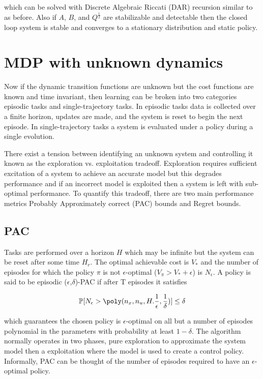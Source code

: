 \documentclass{article}[12pt]
\begin{document}
which can be solved with Discrete Algebraic Riccati (DAR) recursion similar to as before. Also if $A$, $B$, and $Q^{\frac{1}{2}}$ are stabilizable and detectable then the closed loop system is stable and converges to a stationary distribution and static policy.

\section{MDP with unknown dynamics}
Now if the dynamic transition functions are unknown but the cost functions are known and time invariant, then learning can be broken into two categories episodic tasks and single-trajectory tasks. In episodic tasks data is collected over a finite horizon, updates are made, and the system is reset to begin the next episode. In single-trajectory tasks a system is evaluated under a policy during a single evolution. 

There exist a tension between identifying an unknown system and controlling it known as the exploration vs. exploitation tradeoff. Exploration requires sufficient excitation of a system to achieve an accurate model but this degrades performance and if an incorrect model is exploited then a system is left with sub-optimal performance. To quantify this tradeoff, there are two main performance metrics Probably Approximately correct (PAC) bounds and Regret bounds.

\subsection{PAC}
Tasks are performed over a horizon $H$ which may be infinite but the system can be reset after some time $H_r$. The optimal achievable cost is $V_*$ and the number of episodes for which the policy $\pi$ is not $\epsilon$-optimal ($V_{\pi} > V_{*} + \epsilon$) is $N_\epsilon$. A policy is said to be episodic ($\epsilon$,$\delta$)-PAC if after T episodes it satisfies

\begin{equation}
    \Pr[N_{\epsilon} > \poly(n_x,n_u,H.\frac{1}{\epsilon},\frac{1}{\delta})] \leq \delta \\
\end{equation}

which guarantees the chosen policy is $\epsilon$-optimal on all but a number of episodes polynomial in the parameters with probability at least $1-\delta$. The algorithm normally operates in two phases, pure exploration to approximate the system model then a exploitation where the model is used to create a control policy. Informally, PAC can be thought of the number of episodes required to have an $\epsilon$-optimal policy. 
\end{document}

